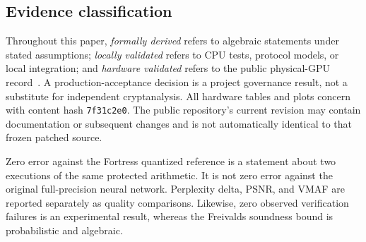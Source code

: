 \subsection{Evidence classification}

Throughout this paper, \emph{formally derived} refers to algebraic statements under stated assumptions; \emph{locally validated} refers to CPU tests, protocol models, or local integration; and \emph{hardware validated} refers to the public physical-GPU record~\cite{xurcroh-validation}. A production-acceptance decision is a project governance result, not a substitute for independent cryptanalysis. All hardware tables and plots concern \frozenbuild{} with content hash \texttt{7f31c2e0}. The public repository's current revision may contain documentation or subsequent changes and is not automatically identical to that frozen patched source.

\begin{evidencebox}
Zero error against the Fortress quantized reference is a statement about two executions of the same protected arithmetic. It is not zero error against the original full-precision neural network. Perplexity delta, PSNR, and VMAF are reported separately as quality comparisons. Likewise, zero observed verification failures is an experimental result, whereas the Freivalds soundness bound is probabilistic and algebraic.
\end{evidencebox}
